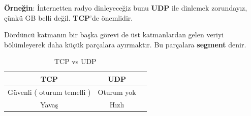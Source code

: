 \textbf{Örneğin}: İnternetten radyo dinleyeceğiz bunu \textbf{UDP} ile dinlemek zorundayız, çünkü GB belli değil.
\textbf{TCP}'de önemlidir.

\tab Dördüncü katmanın bir başka görevi de üst katmanlardan gelen veriyi bölümleyerek daha küçük parçalara ayırmaktır.
Bu parçalara \textbf{segment} denir.

\begin{table}[h]
	\centering
	\caption{TCP vs UDP}
	\label{tab:tcp_vs_upd}
	\begin{tabular}{|c|c|c|}
		\hline
		TCP  & UDP \\
		\hline
		Güvenli ( oturum temelli ) & Oturum yok \\
		\hline
		 Yavaş & Hızlı \\
		\hline
	\end{tabular}
\end{table}


